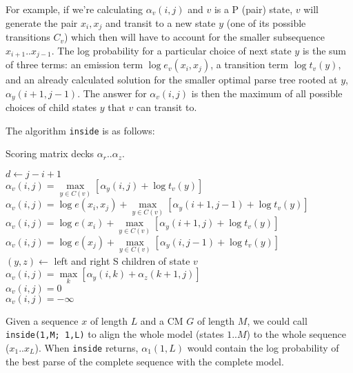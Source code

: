 \documentclass[11pt]{article}
\begin{document}
For example, if we're calculating $\alpha_v(i,j)$ and $v$ is a P
(pair) state, $v$ will generate the pair $x_i,x_j$ and transit to a
new state $y$ (one of its possible transitions $C_v$) which then will
have to account for the smaller subsequence $x_{i+1}..x_{j-1}$. The
log probability for a particular choice of next state $y$ is the sum
of three terms: an emission term $\log e_v(x_i,x_j)$, a transition
term $\log t_v(y)$, and an already calculated solution for the smaller
optimal parse tree rooted at $y$, $\alpha_y(i+1,j-1)$. The answer for
$\alpha_v(i,j)$ is then the maximum of all possible choices of child
states $y$ that $v$ can transit to.

The algorithm \texttt{inside} is as follows:

\begin{algorithm}
         {Scoring matrix decks $\alpha_r..\alpha_z$.}
\begin{algtab*}
       $d \leftarrow j-i+1$\\
       	$\alpha_v(i,j) = \max\limits_{y \in C(v)} \left[ \alpha_y(i,j)  + \log t_v(y) \right]$\\
	$\alpha_v(i,j) = \log e(x_i, x_j) + \max\limits_{y \in C(v)} \left[ \alpha_y(i+1,j-1) + \log t_v(y) \right]$\\
        $\alpha_v(i,j) = \log e(x_i) + \max\limits_{y \in C(v)} \left[ \alpha_y(i+1,j)   + \log t_v(y) \right]$\\
        $\alpha_v(i,j) = \log e(x_j) +      \max\limits_{y \in C(v)} \left[ \alpha_y(i,j-1)   + \log t_v(y) \right]$ \\
        $(y,z) \leftarrow $ left and right S children of state $v$\\
        $\alpha_v(i,j) = \max\limits_k \left[ \alpha_y(i,k) + \alpha_z(k+1,j) \right]$ \\
	$\alpha_v(i,j) = 0$\\
       \algelse
	$\alpha_v(i,j) = -\infty$\\
\end{algtab*}
\end{algorithm}

Given a sequence $x$ of length $L$ and a CM $G$ of length $M$, we
could call \texttt{inside(1,M; 1,L)} to align the whole model (states
$1..M$) to the whole sequence ($x_1..x_L$). When \texttt{inside}
returns, $\alpha_1(1,L)$ would contain the log probability of the best
parse of the complete sequence with the complete model. 
\end{document}
